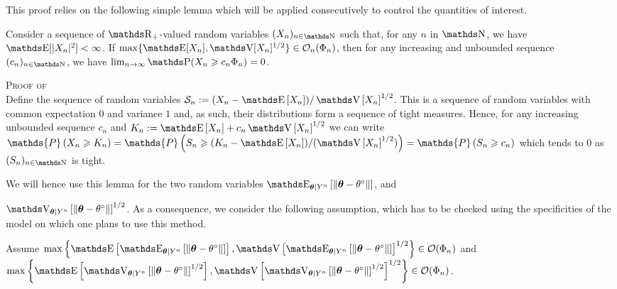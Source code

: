 This proof relies on the following simple lemma which will be applied consecutively to control the quantities of interest.

\begin{lm}\label{LM_BAYES_STRATEGIES_BASIC}
Consider a sequence of $\R_{+}$-valued random variables $(X_{n})_{n \in \N}$ such that, for any $n$ in $\N$, we have $\E[\vert X_{n} \vert^{2}] < \infty$.
If $\max\{\E[X_{n}], \V[X_{n}]^{1/2}\} \in \mathcal{O}_{n}(\Phi_{n})$, then for any increasing and unbounded sequence $(c_{n})_{n \in \N}$, we have $\lim_{n \rightarrow \infty} \P(X_{n} \geq c_{n} \Phi_{n}) = 0$.
\reEnd
\end{lm}

\begin{pro}\label{PRO_BAYES_STRATEGIES_BASIC}{\textsc{Proof of }\\}
Define the sequence of random variables $\mathcal{S}_{n} := (X_{n} - \E\left[X_{n}\right])/\V\left[X_{n}\right]^{1/2}$.
This is a sequence of random variables with common expectation $0$ and variance $1$ and, as such, their distributions form a sequence of tight measures.
Hence, for any increasing unbounded sequence $c_{n}$ and $K_{n} := \E\left[X_{n}\right] + c_{n} \V\left[X_{n}\right]^{1/2}$ we can write
$\mathds{P}\left(X_{n} \geq K_{n} \right) = \mathds{P}\left(S_{n} \geq (K_{n} - \E\left[X_{n}\right])/(\V\left[X_{n}\right]^{1/2})\right)=\mathds{P}\left(S_{n} \geq c_{n}\right)$
which tends to $0$ as $(S_{n})_{n \in \N}$ is tight.
\proEnd
\end{pro}

We will hence use this lemma for the two random variables $\E_{\boldsymbol{\theta} \vert Y^{n}}\left[\Vert \boldsymbol{\theta} - \theta^{\circ} \Vert\right]$, and

$\V_{\boldsymbol{\theta} \vert Y^{n}}\left[\Vert \boldsymbol{\theta} - \theta^{\circ} \Vert\right]^{1/2}$.
As a consequence, we consider the following assumption, which has to be checked using the specificities of the model on which one plans to use this method.

\begin{as}\label{AS_BAYES_STRATEGIES}
Assume $\max\left\{ \E\left[\E_{\boldsymbol{\theta} \vert Y^{n}}\left[\Vert \boldsymbol{\theta} - \theta^{\circ} \Vert\right]\right], \V\left[ \E_{\boldsymbol{\theta} \vert Y^{n}}\left[\Vert \boldsymbol{\theta} - \theta^{\circ} \Vert\right]\right]^{1/2} \right\} \in \mathcal{O}(\Phi_{n})$ and $\max\left\{ \E\left[\V_{\boldsymbol{\theta} \vert Y^{n}}\left[\Vert \boldsymbol{\theta} - \theta^{\circ} \Vert\right]^{1/2}\right], \V\left[ \V_{\boldsymbol{\theta} \vert Y^{n}}\left[\Vert \boldsymbol{\theta} - \theta^{\circ} \Vert\right]^{1/2}\right]^{1/2} \right\} \in \mathcal{O}(\Phi_{n})$.
\assEnd
\end{as}

